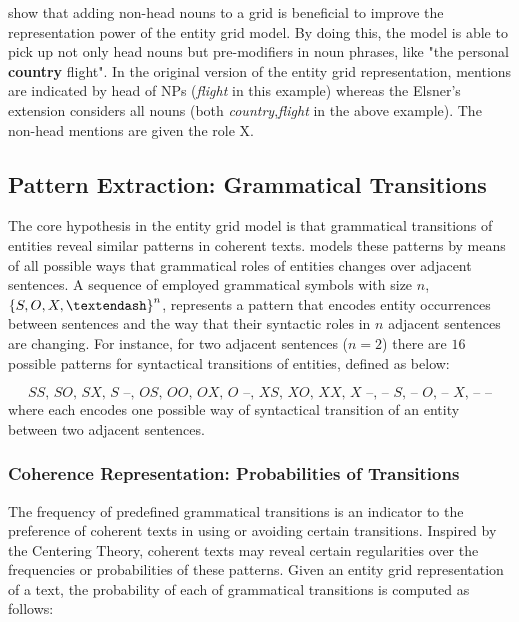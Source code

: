 \cite{elsner11a} show that adding non-head nouns to a grid is beneficial to improve the representation power of the entity grid model. 
By doing this, the model is able to pick up not only head nouns but pre-modifiers in noun phrases, like "the personal \textbf{country} flight". 
In the original version of the entity grid representation, mentions are indicated by head of NPs (\emph{flight} in this example) whereas the Elsner's extension considers all nouns (both \emph{country},\emph{flight} in the above example). 
The non-head mentions are given the role X. 

\subsection{Pattern Extraction: Grammatical Transitions}
%
The core hypothesis in the entity grid model is that grammatical transitions of entities reveal similar patterns in coherent texts. 
 models these patterns by means of all possible ways that grammatical roles of entities changes over adjacent sentences. 
A sequence of employed grammatical symbols with size $n$, $\left \{S,O,X,\-–\right \}^n$, represents a pattern that encodes entity occurrences between sentences and the way that their syntactic roles in $n$ adjacent sentences are changing. 
For instance, for two adjacent sentences ($n=2$) there are $16$ possible patterns for syntactical transitions of entities, defined as below:

\begin{equation}
S S\textit{, }S O\textit{, } S X\textit{, } S \textit{ --, }  O S\textit{, }O O\textit{, }O X\textit{, }  O \textit{ --, }  X S\textit{, }  X O\textit{, }  X X\textit{, } X \textit{ --, -- }S\textit{, -- }O\textit{, -- }X\textit{, -- --}  
\end{equation}
%
where each encodes one possible way of syntactical transition of an entity between two adjacent sentences. 

\subsubsection{Coherence Representation: Probabilities of Transitions}
%
The frequency of predefined grammatical transitions is an indicator to the preference of coherent texts in using or avoiding certain transitions. 
Inspired by the Centering Theory, coherent texts may reveal certain regularities over the frequencies or probabilities of these patterns. 
Given an entity grid representation of a text, the probability of each of grammatical transitions is computed as follows:

